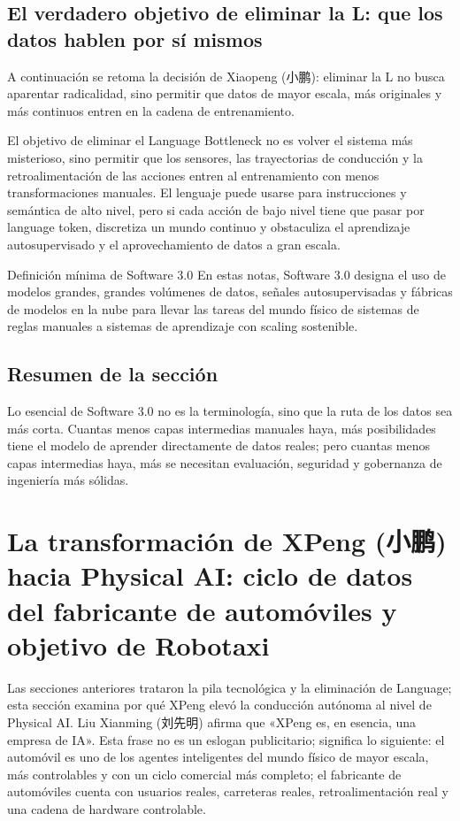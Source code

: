 \documentclass[a4paper]{article}
\begin{document}
\subsection{El verdadero objetivo de eliminar la L: que los datos hablen por sí mismos}

A continuación se retoma la decisión de Xiaopeng (小鹏): eliminar la L no busca aparentar radicalidad, sino permitir que datos de mayor escala, más originales y más continuos entren en la cadena de entrenamiento.

El objetivo de eliminar el Language Bottleneck no es volver el sistema más misterioso, sino permitir que los sensores, las trayectorias de conducción y la retroalimentación de las acciones entren al entrenamiento con menos transformaciones manuales. El lenguaje puede usarse para instrucciones y semántica de alto nivel, pero si cada acción de bajo nivel tiene que pasar por language token, discretiza un mundo continuo y obstaculiza el aprendizaje autosupervisado y el aprovechamiento de datos a gran escala.

\begin{importantbox}{Definición mínima de Software 3.0}
En estas notas, Software 3.0 designa el uso de modelos grandes, grandes volúmenes de datos, señales autosupervisadas y fábricas de modelos en la nube para llevar las tareas del mundo físico de sistemas de reglas manuales a sistemas de aprendizaje con scaling sostenible.
\end{importantbox}

\subsection{Resumen de la sección}

Lo esencial de Software 3.0 no es la terminología, sino que la ruta de los datos sea más corta. Cuantas menos capas intermedias manuales haya, más posibilidades tiene el modelo de aprender directamente de datos reales; pero cuantas menos capas intermedias haya, más se necesitan evaluación, seguridad y gobernanza de ingeniería más sólidas.
\section{La transformación de XPeng (小鹏) hacia Physical AI: ciclo de datos del fabricante de automóviles y objetivo de Robotaxi}

Las secciones anteriores trataron la pila tecnológica y la eliminación de Language; esta sección examina por qué XPeng elevó la conducción autónoma al nivel de Physical AI. Liu Xianming (刘先明) afirma que «XPeng es, en esencia, una empresa de IA». Esta frase no es un eslogan publicitario; significa lo siguiente: el automóvil es uno de los agentes inteligentes del mundo físico de mayor escala, más controlables y con un ciclo comercial más completo; el fabricante de automóviles cuenta con usuarios reales, carreteras reales, retroalimentación real y una cadena de hardware controlable.
\end{document}
